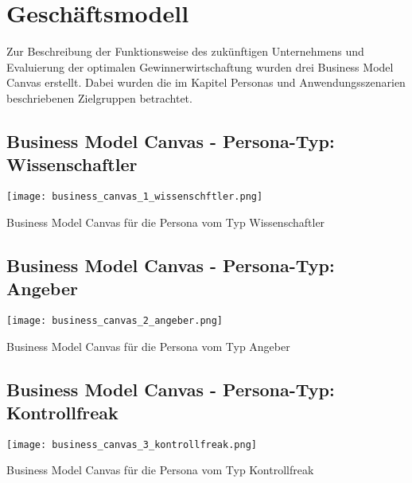    	\section{Geschäftsmodell}
   	Zur Beschreibung der Funktionsweise des zukünftigen Unternehmens und Evaluierung der optimalen Gewinnerwirtschaftung wurden drei Business Model Canvas erstellt. Dabei wurden die im Kapitel Personas und Anwendungsszenarien beschriebenen Zielgruppen betrachtet.

   	\begin{landscape}
	\newpage
	\subsection{Business Model Canvas - Persona-Typ: Wissenschaftler}
   	\begin{table}[h!]
		\begin{center}
			\texttt{[image: business\_canvas\_1\_wissenschftler.png]}
		\end{center}
		\caption[Business Model Canvas - Persona-Typ: Wissenschaftler]{Business Model Canvas für die Persona vom Typ Wissenschaftler}
		\label{fig:business_model_1}
	\end{table}
	
	\newpage
   	\subsection{Business Model Canvas - Persona-Typ: Angeber}
   	\begin{table}[h!]
		\begin{center}
			\texttt{[image: business\_canvas\_2\_angeber.png]}
		\end{center}
		\caption[Business Model Canvas - Persona-Typ: Angeber]{Business Model Canvas für die Persona vom Typ Angeber}
		\label{fig:business_model_2}
	\end{table}
	
	\newpage
	\subsection{Business Model Canvas - Persona-Typ: Kontrollfreak}
   	\begin{table}[h!]
		\begin{center}
			\texttt{[image: business\_canvas\_3\_kontrollfreak.png]}
		\end{center}
		\caption[Business Model Canvas - Persona-Typ: Kontrollfreak]{Business Model Canvas für die Persona vom Typ Kontrollfreak}
		\label{fig:business_model_3}
	\end{table}


\end{landscape}
